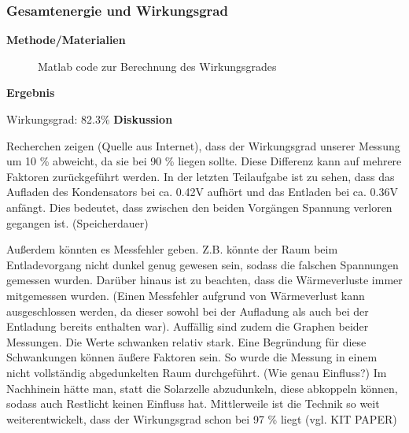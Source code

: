     \subsubsection{Gesamtenergie und Wirkungsgrad}                      %
        \textbf{Methode/Materialien}
        \newline
        \par
        \begin{figure}[H]
            
            \caption{Matlab code zur Berechnung des Wirkungsgrades}
        \end{figure}
        \vspace{4mm}
        \textbf{Ergebnis}
        \newline
        \par Wirkungsgrad: 82.3\%
        \vspace{4mm}
        \newline
        \textbf{Diskussion}
        \newline
        \par Recherchen zeigen (Quelle aus Internet), dass der Wirkungsgrad unserer Messung um 10 \% abweicht, da
        sie bei 90 \% liegen sollte. Diese Differenz kann auf mehrere Faktoren zurückgeführt werden.
        In der letzten Teilaufgabe ist zu sehen, dass das Aufladen des Kondensators bei ca. 0.42V aufhört und
        das Entladen bei ca. 0.36V anfängt. Dies bedeutet, dass zwischen den beiden Vorgängen Spannung
        verloren gegangen ist. (Speicherdauer)
        \par Außerdem könnten es Messfehler geben. Z.B. könnte der Raum beim Entladevorgang nicht dunkel
        genug gewesen sein, sodass die falschen Spannungen gemessen wurden. Darüber hinaus ist zu beachten, dass die Wärmeverluste immer mitgemessen wurden. (Einen Messfehler aufgrund von Wärmeverlust kann ausgeschlossen werden, da dieser sowohl bei der Aufladung als auch bei der Entladung bereits enthalten war).
        Auffällig sind zudem die Graphen beider Messungen. Die Werte schwanken relativ stark. Eine Begründung für diese Schwankungen können äußere Faktoren sein. So wurde die Messung in einem nicht vollständig abgedunkelten Raum durchgeführt. (Wie genau Einfluss?) Im Nachhinein hätte man, statt die Solarzelle abzudunkeln, diese abkoppeln können, sodass auch Restlicht keinen Einfluss hat. 
        Mittlerweile ist die Technik so weit weiterentwickelt, dass der Wirkungsgrad schon bei 97 \% liegt (vgl. KIT PAPER) 
